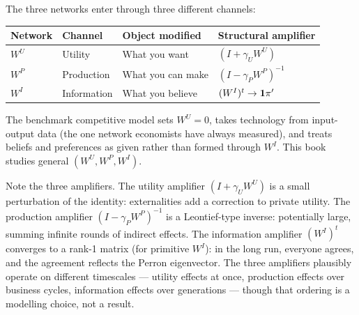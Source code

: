 \documentclass[../structural_economics_book.tex]{subfiles}
\begin{document}
\begin{keyinsight}
The three networks enter through three different channels:
\begin{center}
\begin{tabular}{llll}
\toprule
Network & Channel & Object modified & Structural amplifier \\
\midrule
$W^U$ & Utility & What you want & $(I + \gamma_U W^U)$ \\
$W^P$ & Production & What you can make & $(I - \gamma_P W^P)^{-1}$ \\
$W^I$ & Information & What you believe & $(W^I)^t \to \mathbf{1}\pi'$ \\
\bottomrule
\end{tabular}
\end{center}

The benchmark competitive model sets $W^U = 0$, takes technology from input-output data (the one network economists have always measured), and treats beliefs and preferences as given rather than formed through $W^I$. This book studies general $(W^U, W^P, W^I)$.

Note the three amplifiers. The utility amplifier $(I + \gamma_U W^U)$ is a small perturbation of the identity: externalities add a correction to private utility. The production amplifier $(I - \gamma_P W^P)^{-1}$ is a Leontief-type inverse: potentially large, summing infinite rounds of indirect effects. The information amplifier $(W^I)^t$ converges to a rank-1 matrix (for primitive $W^I$): in the long run, everyone agrees, and the agreement reflects the Perron eigenvector. The three amplifiers plausibly operate on different timescales --- utility effects at once, production effects over business cycles, information effects over generations --- though that ordering is a modelling choice, not a result.
\end{keyinsight}
\end{document}
